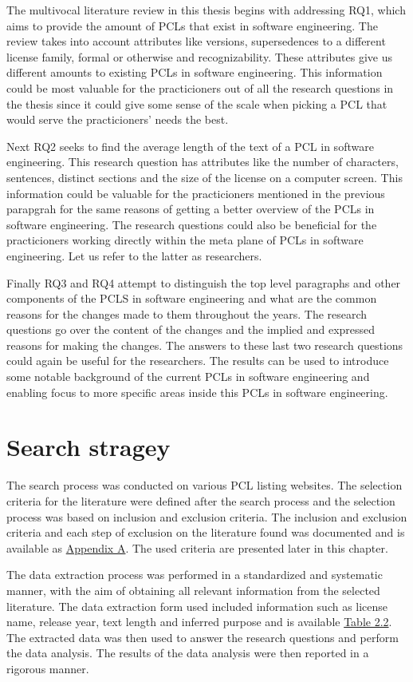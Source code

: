 The multivocal literature review in this thesis begins with addressing RQ1, which aims to provide the amount of PCLs that exist in software engineering. The review takes into account attributes like versions, supersedences to a different license family, formal or otherwise and recognizability. These attributes give us different amounts to existing PCLs in software engineering. This information could be most valuable for the practicioners out of all the research questions in the thesis since it could give some sense of the scale when picking a PCL that would serve the practicioners' needs the best.

Next RQ2 seeks to find the average length of the text of a PCL in software engineering. This research question has attributes like the number of characters, sentences, distinct sections and the size of the license on a computer screen. This information could be valuable for the practicioners mentioned in the previous parapgrah for the same reasons of getting a better overview of the PCLs in software engineering. The research questions could also be beneficial for the practicioners working directly within the meta plane of PCLs in software engineering. Let us refer to the latter as researchers.

Finally RQ3 and RQ4 attempt to distinguish the top level paragraphs and other components of the PCLS in software engineering and what are the common reasons for the changes made to them throughout the years. The research questions go over the content of the changes and the implied and expressed reasons for making the changes. The answers to these last two research questions could again be useful for the researchers. The results can be used to introduce some notable background of the current PCLs in software engineering and enabling focus to more specific areas inside this PCLs in software engineering.

\section{Search stragey}
The search process was conducted on various PCL listing websites. The selection criteria for the literature were defined after the search process and the selection process was based on inclusion and exclusion criteria. The inclusion and exclusion criteria and each step of exclusion on the literature found was documented and is available as \hyperref[appendix:a]{Appendix A}. The used criteria are presented later in this chapter.

The data extraction process was performed in a standardized and systematic manner, with the aim of obtaining all relevant information from the selected literature. The data extraction form used included information such as license name, release year, text length and inferred purpose and is available  \hyperref[table:extraction]{Table 2.2}. The extracted data was then used to answer the research questions and perform the data analysis. The results of the data analysis were then reported in a rigorous manner.
